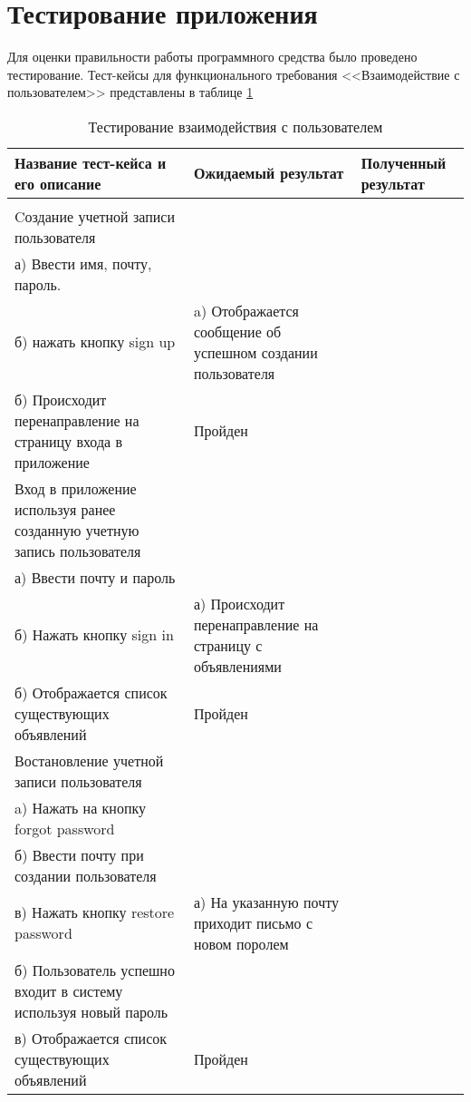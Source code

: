 \section{Тестирование приложения}
\label{sec:testing}

Для оценки правильности работы программного средства было проведено тестирование. Тест-кейсы для функционального требования <<Взаимодействие с пользователем>> представлены в таблице \ref{sec:testing:interaction_cases}



\begin{longtable}[l]{| >{\raggedright}m{}
                  | >{\raggedright}m{}
                  | >{\raggedright\arraybackslash}m{}|}
  \caption{Тестирование взаимодействия с пользователем}
  \label{sec:testing:interaction_cases} \tabularnewline

  \hline
       Название тест-кейса и его описание & Ожидаемый результат  & Полученный результат \\
   \hline
   \centering{1} & \centering{2} & \centering{3} \tabularnewline
   \hline
   Cоздание учетной записи пользователя \\ а) Ввести имя, почту, пароль. \\ б) нажать кнопку sign up  &
   a) Отображается сообщение об успешном создании пользователя \\ б) Происходит перенаправление на страницу входа в приложение &
   Пройден \\
   \hline


  Вход в приложение используя ранее созданную учетную запись пользователя\\
   а) Ввести почту и пароль \\
   б) Нажать кнопку sign in
   &
   а) Происходит перенаправление на страницу с объявлениями\\
   б) Отображается список существующих объявлений
   &
   Пройден \\
   \hline

   Востановление учетной записи пользователя \\
   a) Нажать на кнопку forgot password \\
   б) Ввести почту при создании пользователя \\
   в) Нажать кнопку restore password
   &
   а) На указанную почту приходит письмо с новом поролем \\
   б) Пользователь успешно входит в систему используя новый пароль\\
   в) Отображается список существующих объявлений 
   &
   Пройден \\


\end{longtable}
